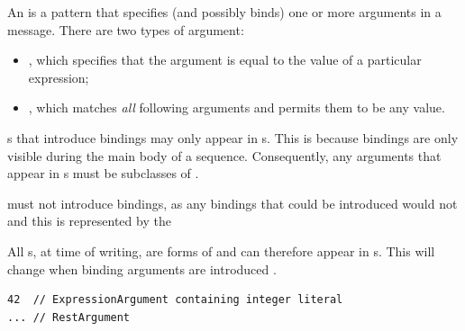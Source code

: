 An \margument{} is a pattern that specifies (and possibly binds) one or more
arguments in
a message.  There are two types of argument:

\begin{itemize}
\item
  \mexpressionargument, which specifies that the argument is equal to the
  value of a particular \robochart{} expression;
\item
  \mrestargument, which matches \emph{all} following arguments and permits
  them to be any value.
\end{itemize}

\margument s that introduce bindings  may only appear in \marrowmessagespec s.
This is because bindings are only visible during the main body of a
sequence.
Consequently, any arguments that appear in
\mgapmessagespec s must be subclasses of \mnonbindingargument.

must not introduce bindings, as
any bindings that could be introduced would not 
and
this is represented by the 

All \margument s, at time of writing, are forms of \mnonbindingargument{} and
can therefore appear in \mgapmessagespec s.  This will change when binding
arguments are introduced
.

\begin{lstlisting}[style=Example]
42  // ExpressionArgument containing integer literal
... // RestArgument
\end{lstlisting}

